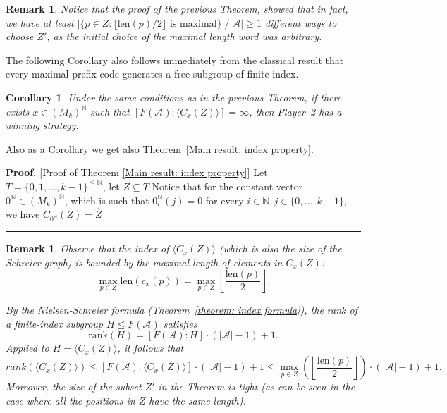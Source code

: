 \documentclass[a4,12pt]{article}%
\newtheorem{corollary}[theorem]{Corollary}
\newtheorem{remark}[theorem]{Remark}
\newenvironment{proof}[1][Proof]{\textbf{#1.} }{\ \rule{0.5em}{0.5em}}
\newcommand{\N}{\mathbb{N}}
\begin{document}
\begin{remark}
Notice that the proof of the previous Theorem, showed that in fact, we have at least $|\{p \in Z : \lfloor \mathrm{len}(p)/2 \rfloor \text{ is maximal} \}|/|\mathcal{A}|\geq 1$ different ways to choose $Z'$, as the initial choice of the maximal length word was arbitrary.    
\end{remark}

The following Corollary also follows immediately from the classical result that every maximal prefix code generates a free subgroup of finite index.

\begin{corollary}
    Under the same conditions as in the previous Theorem, if there exists $x \in (M_k)^\N$ such that  $[F(\mathcal{A}):\langle C_x(Z) \rangle]= \infty$, then Player~2 has a winning strategy.
\end{corollary}
Also as a Corollary we get also Theorem~\ref{Main result: index property}.

\medskip

\begin{proof} [Proof of Theorem \ref{Main result: index property}]
    Let $T=\{0,1,\dots,k-1\}^{\leq \mathbb{N}}$, let $Z \subseteq T$
    Notice that for the constant vector $0^\N \in (M_k)^\N$, which is such that $0^\N_i(j)=0$ for every $i \in \N , j\in \{0,\dots,k-1\}$, we have $C_{0^\N}(Z)=\hat{Z}$
\end{proof}
\begin{remark}    
Observe that the index of $\langle C_x(Z) \rangle$ (which is also the size of the Schreier graph) is bounded by the maximal
length of elements in $C_x(Z)$:
\[
\max_{p \in Z} \mathrm{len}(c_x(p)) = \max_{p \in Z} \left\lfloor \frac{\mathrm{len}(p)}{2} \right\rfloor.
\]

By the Nielsen-Schreier formula (Theorem~\ref{theorem: index formula}), the
rank of a finite-index subgroup $H \leq F(\mathcal{A})$ satisfies
\[
\mathrm{rank}(H) = [F(\mathcal{A}):H] \cdot (|\mathcal{A}|-1) + 1.
\]
Applied to $H = \langle C_x(Z) \rangle$, it follows that
\[
rank(\langle C_x(Z) \rangle) \le [F(\mathcal{A}) : \langle C_x(Z) \rangle] \cdot (|\mathcal{A}|-1) + 1
\leq \max_{p \in Z} \left( \left\lfloor \frac{\mathrm{len}(p)}{2} \right\rfloor \right) \cdot (|\mathcal{A}|-1) + 1.
\]
Moreover, the size of the subset $Z'$ in the Theorem is tight (as can be seen in the case where all the positions in $Z$ have the same length).
\end{remark}

\medskip
\end{document}
